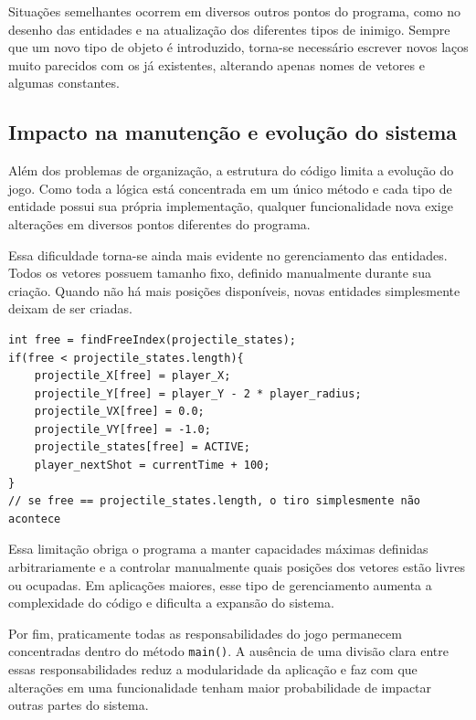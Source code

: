 Situações semelhantes ocorrem em diversos outros pontos do programa, como no
desenho das entidades e na atualização dos diferentes tipos de inimigo. Sempre
que um novo tipo de objeto é introduzido, torna-se necessário escrever novos
laços muito parecidos com os já existentes, alterando apenas nomes de vetores e
algumas constantes.

\subsection{Impacto na manutenção e evolução do sistema}

Além dos problemas de organização, a estrutura do código limita a evolução do
jogo. Como toda a lógica está concentrada em um único método e cada tipo de
entidade possui sua própria implementação, qualquer funcionalidade nova exige
alterações em diversos pontos diferentes do programa.

Essa dificuldade torna-se ainda mais evidente no gerenciamento das entidades.
Todos os vetores possuem tamanho fixo, definido manualmente durante sua criação.
Quando não há mais posições disponíveis, novas entidades simplesmente deixam de
ser criadas.

\begin{lstlisting}[caption={Projetil descartado quando todos os índices do vetor estão ocupados (Main.java)}]
int free = findFreeIndex(projectile_states);
if(free < projectile_states.length){
    projectile_X[free] = player_X;
    projectile_Y[free] = player_Y - 2 * player_radius;
    projectile_VX[free] = 0.0;
    projectile_VY[free] = -1.0;
    projectile_states[free] = ACTIVE;
    player_nextShot = currentTime + 100;
}
// se free == projectile_states.length, o tiro simplesmente não acontece
\end{lstlisting}

Essa limitação obriga o programa a manter capacidades máximas definidas
arbitrariamente e a controlar manualmente quais posições dos vetores estão
livres ou ocupadas. Em aplicações maiores, esse tipo de gerenciamento aumenta a
complexidade do código e dificulta a expansão do sistema.

Por fim, praticamente todas as responsabilidades do jogo permanecem concentradas dentro
do método \texttt{main()}. A ausência de uma divisão clara entre essas
responsabilidades reduz a modularidade da aplicação e faz com que alterações em
uma funcionalidade tenham maior probabilidade de impactar outras partes do
sistema.


